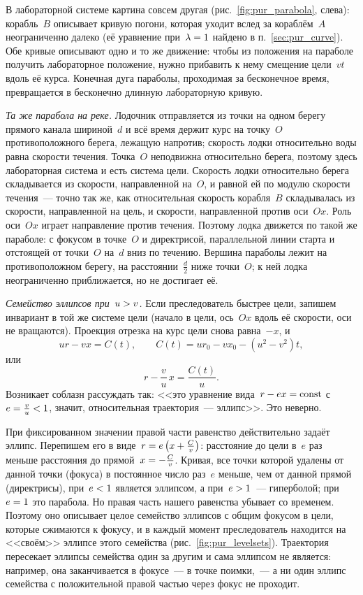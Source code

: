 \documentclass[../main.tex]{subfiles}
\begin{document}
В лабораторной системе картина совсем другая (рис.~\ref{fig:pur_parabola}, слева):
корабль~$B$ описывает кривую погони, которая уходит вслед за кораблём~$A$
неограниченно далеко (её уравнение при~$\lambda \hm= 1$ найдено в
п.~\ref{sec:pur_curve}). Обе кривые описывают одно и то же движение: чтобы из
положения на параболе получить лабораторное положение, нужно прибавить к нему
смещение цели~$vt$ вдоль её курса. Конечная дуга параболы, проходимая за
бесконечное время, превращается в бесконечно длинную лабораторную кривую.

\noindent\textit{Та же парабола на реке.} Лодочник отправляется из точки на одном
берегу прямого канала шириной~$d$ и всё время держит курс на точку~$O$
противоположного берега, лежащую напротив; скорость лодки относительно воды равна
скорости течения. Точка~$O$ неподвижна относительно берега, поэтому здесь
лабораторная система и есть система цели. Скорость лодки относительно берега
складывается из скорости, направленной на~$O$, и равной ей по модулю скорости
течения~--- точно так же, как относительная скорость корабля~$B$ складывалась из
скорости, направленной на цель, и скорости, направленной против оси~$Ox$. Роль оси~$Ox$
играет направление против течения. Поэтому лодка движется по такой же параболе: с
фокусом в точке~$O$ и директрисой, параллельной линии старта и отстоящей от точки~$O$ на~$d$ вниз по течению. Вершина параболы лежит на противоположном берегу, на
расстоянии~$\frac{d}{2}$ ниже точки~$O$; к ней лодка неограниченно приближается, но
не достигает её.

\noindent\textit{Семейство эллипсов при~$u >\nobreak v$.} Если преследователь быстрее цели,
запишем инвариант в той же системе цели (начало в цели, ось~$Ox$ вдоль её скорости,
оси не вращаются). Проекция отрезка на курс цели снова равна~$-x$, и
\[
ur - vx = C(t),
\qquad
C(t) = ur_0 - vx_0 - (u^2 - v^2)t,
\]
или
\[
r - \frac{v}{u}\,x = \frac{C(t)}{u}.
\]
Возникает соблазн рассуждать так: <<это уравнение вида~$r - ex \hm= \text{const}$
с~$e \hm= \frac{v}{u} <\nobreak 1$, значит, относительная траектория~--- эллипс>>. Это неверно.

При фиксированном значении правой части равенство действительно задаёт эллипс.
Перепишем его в виде~$r \hm= e\left(x + \frac{C}{v}\right)$: расстояние до цели в~$e$ раз меньше расстояния до прямой~$x \hm= -\frac{C}{v}$. Кривая, все точки которой
удалены от данной точки (фокуса) в постоянное число раз~$e$ меньше, чем от данной
прямой (директрисы), при~$e <\nobreak 1$ является эллипсом, а при~$e >\nobreak 1$~--- гиперболой;
при~$e \hm= 1$ это парабола. Но правая часть нашего равенства убывает со временем.
Поэтому оно описывает целое семейство эллипсов с общим фокусом в цели, которые
сжимаются к фокусу, и в каждый момент преследователь находится на <<своём>> эллипсе
этого семейства (рис.~\ref{fig:pur_levelsets}). Траектория пересекает эллипсы
семейства один за другим и сама эллипсом не является: например, она заканчивается
в фокусе~--- в точке поимки,~--- а ни один эллипс семейства с положительной правой
частью через фокус не проходит.
\end{document}
